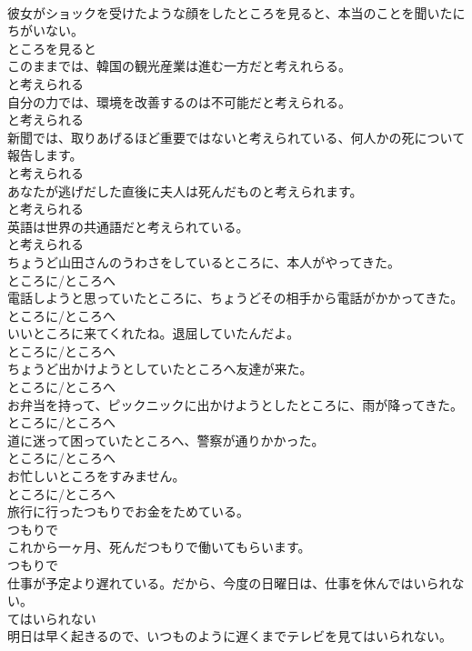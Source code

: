 \documentclass[8pt]{extreport}
\begin{document}
\begin{CJK}{UTF8}{min}
\\	彼女がショックを受けたような顔をしたところを見ると、本当のことを聞いたにちがいない。	
\\	ところを見ると
\\	このままでは、韓国の観光産業は進む一方だと考えれらる。	
\\	と考えられる
\\	自分の力では、環境を改善するのは不可能だと考えられる。	
\\	と考えられる
\\	新聞では、取りあげるほど重要ではないと考えられている、何人かの死について報告します。	
\\	と考えられる
\\	あなたが逃げだした直後に夫人は死んだものと考えられます。	
\\	と考えられる
\\	英語は世界の共通語だと考えられている。	
\\	と考えられる
\\	ちょうど山田さんのうわさをしているところに、本人がやってきた。	
\\	ところに/ところへ
\\	電話しようと思っていたところに、ちょうどその相手から電話がかかってきた。	
\\	ところに/ところへ
\\	いいところに来てくれたね。退屈していたんだよ。	
\\	ところに/ところへ
\\	ちょうど出かけようとしていたところへ友達が来た。	
\\	ところに/ところへ
\\	お弁当を持って、ピックニックに出かけようとしたところに、雨が降ってきた。	
\\	ところに/ところへ
\\	道に迷って困っていたところへ、警察が通りかかった。	
\\	ところに/ところへ
\\	お忙しいところをすみません。	
\\	ところに/ところへ
\\	旅行に行ったつもりでお金をためている。	
\\	つもりで
\\	これから一ヶ月、死んだつもりで働いてもらいます。	
\\	つもりで
\\	仕事が予定より遅れている。だから、今度の日曜日は、仕事を休んではいられない。	
\\	てはいられない
\\	明日は早く起きるので、いつものように遅くまでテレビを見てはいられない。	

\end{CJK}
\end{document}
